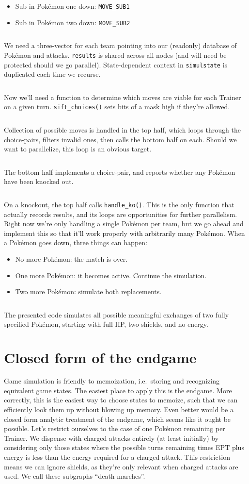 \begin{itemize}
\item Sub in Pokémon one down: \texttt{MOVE\_SUB1}
\item Sub in Pokémon two down: \texttt{MOVE\_SUB2}
\end{itemize}
\inputminted{cpp}{s/moves.h}
We need a three-vector for each team pointing into our (readonly) database of Pokémon and attacks.
\texttt{results} is shared across all nodes (and will need be protected should we go parallel).
State-dependent context in \texttt{simulstate} is duplicated each time we recurse.
\inputminted{cpp}{s/simul.h}
Now we'll need a function to determine which moves are viable for each Trainer on a given turn.
\texttt{sift\_choices()} sets bits of a mask high if they're allowed.
\inputminted{cpp}{s/sift.h}
Collection of possible moves is handled in the top half, which loops through the choice-pairs,
  filters invalid ones, then calls the bottom half on each.
Should we want to parallelize, this loop is an obvious target.
\inputminted{cpp}{s/top.h}
The bottom half implements a choice-pair, and reports whether
  any Pokémon have been knocked out.
\inputminted{cpp}{s/bottom.h}
On a knockout, the top half calls \texttt{handle\_ko()}.
This is the only function that actually records results, and its loops are opportunities for further parallelism.
Right now we're only handling a single Pokémon per team, but we
 go ahead and implement this so that it'll work properly
 with arbitrarily many Pokémon.
When a Pokémon goes down, three things can happen:
\begin{itemize}
  \item No more Pokémon: the match is over.
  \item One more Pokémon: it becomes active. Continue the simulation.
  \item Two more Pokémon: simulate both replacements.
\end{itemize}
\inputminted{cpp}{s/ko.h}
The presented code simulates all possible meaningful exchanges of two fully specified Pokémon, starting
  with full HP, two shields, and no energy.

\section{Closed form of the endgame}
\label{sec:endgame}
Game simulation is friendly to memoization, i.e.\ storing and recognizing equivalent game states.
The easiest place to apply this is the endgame.
More correctly, this is the easiest way to choose states to memoize,
  such that we can efficiently look them up without blowing up memory.
Even better would be a closed form analytic treatment of the endgame,
  which seems like it ought be possible.
Let's restrict ourselves to the case of one Pokémon remaining per Trainer.
We dispense with charged attacks entirely (at least initially) by considering
  only those states where the possible turns remaining times EPT plus
  energy is less than the energy required for a charged attack.
This restriction means we can ignore shields, as they're only relevant
  when charged attacks are used.
We call these subgraphs ``death marches''.

